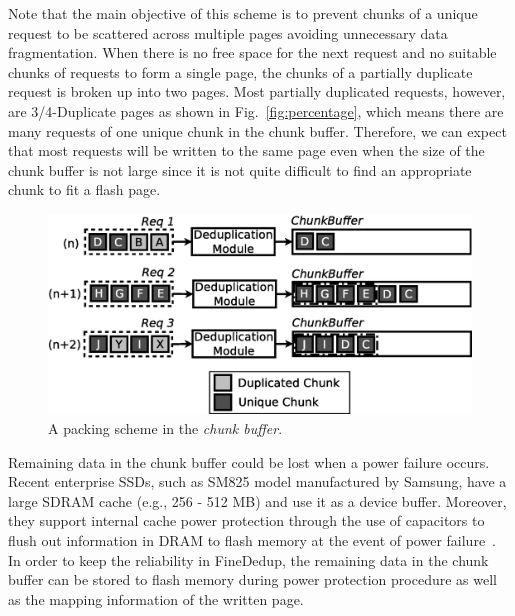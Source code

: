Note that the main objective of this scheme is to prevent chunks of a unique request to be scattered across multiple pages 
avoiding unnecessary data fragmentation.
When there is no free space for the next request and no suitable chunks of requests to form a single page,
the chunks of a partially duplicate request is broken up into two pages.
Most partially duplicated requests, however, are 3/4-Duplicate pages as shown in Fig.~\ref{fig:percentage}, which means 
there are many requests of one unique chunk in the chunk buffer.
Therefore, we can expect that most requests will be written to the same page even when the size of the chunk buffer is not large 
since it is not quite difficult to find an appropriate chunk to fit a flash page.
\begin{figure}[t]
	\center
	\includegraphics[scale=0.4]{figure/finededup/chunkbuffer}
	\caption{A packing scheme in the \textit{chunk buffer}.} %
	\label{fig:chunkbuffer}
\end{figure}


Remaining data in the chunk buffer could be lost when a power failure occurs.
Recent enterprise SSDs, such as SM825 model manufactured by Samsung, have a large SDRAM cache (e.g., 256 - 512 MB) and use it as a device buffer.
Moreover, they support internal cache power protection through the use of capacitors to flush out information in DRAM to flash memory 
at the event of power failure~\cite{sm825}.
In order to keep the reliability in FineDedup, the remaining data in the chunk buffer can be stored to flash memory 
during power protection procedure as well as the mapping information of the written page.

